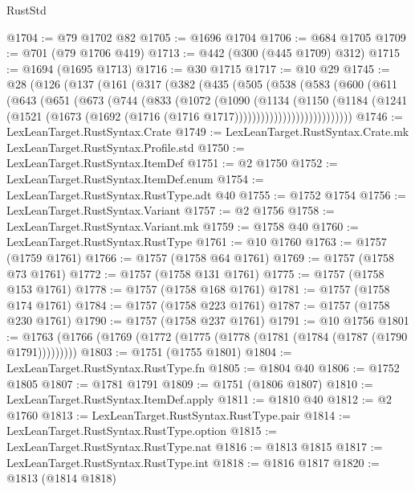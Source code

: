 \begin{lexlean}{RustStd}
\begin{coremodule}
@1704 := @79 @1702 @82
@1705 := @1696 @1704
@1706 := @684 @1705
@1709 := @701 (@79 @1706 @419)
@1713 := @442 (@300 (@445 @1709) @312)
@1715 := @1694 (@1695 @1713)
@1716 := @30 @1715
@1717 := @10 @29
@1745 := @28
    (@126
      (@137
        (@161
          (@317
            (@382
              (@435
                (@505
                  (@538
                    (@583
                      (@600
                        (@611
                          (@643
                            (@651
                              (@673
                                (@744
                                  (@833
                                    (@1072
                                      (@1090
                                        (@1134
                                          (@1150
                                            (@1184
                                              (@1241
                                                (@1521
                                                  (@1673
                                                    (@1692
                                                      (@1716 (@1716 @1717)))))))))))))))))))))))))))
@1746 := LexLeanTarget.RustSyntax.Crate
@1749 := LexLeanTarget.RustSyntax.Crate.mk LexLeanTarget.RustSyntax.Profile.std
@1750 := LexLeanTarget.RustSyntax.ItemDef
@1751 := @2 @1750
@1752 := LexLeanTarget.RustSyntax.ItemDef.enum
@1754 := LexLeanTarget.RustSyntax.RustType.adt @40
@1755 := @1752 @1754
@1756 := LexLeanTarget.RustSyntax.Variant
@1757 := @2 @1756
@1758 := LexLeanTarget.RustSyntax.Variant.mk
@1759 := @1758 @40
@1760 := LexLeanTarget.RustSyntax.RustType
@1761 := @10 @1760
@1763 := @1757 (@1759 @1761)
@1766 := @1757 (@1758 @64 @1761)
@1769 := @1757 (@1758 @73 @1761)
@1772 := @1757 (@1758 @131 @1761)
@1775 := @1757 (@1758 @153 @1761)
@1778 := @1757 (@1758 @168 @1761)
@1781 := @1757 (@1758 @174 @1761)
@1784 := @1757 (@1758 @223 @1761)
@1787 := @1757 (@1758 @230 @1761)
@1790 := @1757 (@1758 @237 @1761)
@1791 := @10 @1756
@1801 := @1763 (@1766 (@1769 (@1772 (@1775 (@1778 (@1781 (@1784 (@1787 (@1790 @1791)))))))))
@1803 := @1751 (@1755 @1801)
@1804 := LexLeanTarget.RustSyntax.RustType.fn
@1805 := @1804 @40
@1806 := @1752 @1805
@1807 := @1781 @1791
@1809 := @1751 (@1806 @1807)
@1810 := LexLeanTarget.RustSyntax.ItemDef.apply
@1811 := @1810 @40
@1812 := @2 @1760
@1813 := LexLeanTarget.RustSyntax.RustType.pair
@1814 := LexLeanTarget.RustSyntax.RustType.option
@1815 := LexLeanTarget.RustSyntax.RustType.nat
@1816 := @1813 @1815
@1817 := LexLeanTarget.RustSyntax.RustType.int
@1818 := @1816 @1817
@1820 := @1813 (@1814 @1818)

\end{coremodule}
\end{lexlean}

